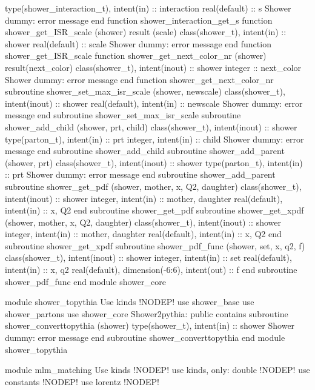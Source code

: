       type(shower_interaction_t), intent(in) :: interaction
      real(default) :: s
      \LA{}Shower dummy: error message\RA{}
    end function shower_interaction_get_s
    function shower_get_ISR_scale (shower) result (scale)
      class(shower_t), intent(in) :: shower
      real(default) :: scale
      \LA{}Shower dummy: error message\RA{}
    end function shower_get_ISR_scale
    function shower_get_next_color_nr (shower) result(next_color)
      class(shower_t), intent(inout) :: shower
      integer :: next_color
      \LA{}Shower dummy: error message\RA{}
    end function shower_get_next_color_nr
    subroutine shower_set_max_isr_scale (shower, newscale)
      class(shower_t), intent(inout) :: shower
      real(default), intent(in) :: newscale
      \LA{}Shower dummy: error message\RA{}
    end subroutine shower_set_max_isr_scale
    subroutine shower_add_child (shower, prt, child)
      class(shower_t), intent(inout) :: shower
      type(parton_t), intent(in) :: prt
      integer, intent(in) :: child
      \LA{}Shower dummy: error message\RA{}
    end subroutine shower_add_child
    subroutine shower_add_parent (shower, prt)
      class(shower_t), intent(inout) :: shower
      type(parton_t), intent(in) :: prt
      \LA{}Shower dummy: error message\RA{}
    end subroutine shower_add_parent
    subroutine shower_get_pdf (shower, mother, x, Q2, daughter)
      class(shower_t), intent(inout) :: shower
      integer, intent(in) :: mother, daughter
      real(default), intent(in) :: x, Q2
    end subroutine shower_get_pdf
    subroutine shower_get_xpdf (shower, mother, x, Q2, daughter)
      class(shower_t), intent(inout) :: shower
      integer, intent(in) :: mother, daughter
      real(default), intent(in) :: x, Q2
    end subroutine shower_get_xpdf    
    subroutine shower_pdf_func (shower, set, x, q2, f)
      class(shower_t), intent(inout) :: shower
      integer, intent(in) :: set
      real(default), intent(in) :: x, q2
      real(default), dimension(-6:6), intent(out) :: f
    end subroutine shower_pdf_func
end module shower_core

module shower_topythia
\LA{}Use kinds\RA{} !NODEP!
  use shower_base
  use shower_partons
  use shower_core
\LA{}Shower2pythia: public\RA{}
contains
  subroutine shower_converttopythia (shower)
    type(shower_t), intent(in) :: shower
    \LA{}Shower dummy: error message\RA{}
    end subroutine shower_converttopythia
end module shower_topythia

module mlm_matching
\LA{}Use kinds\RA{} !NODEP!
  use kinds, only: double !NODEP!
  use constants !NODEP!
  use lorentz !NODEP!

